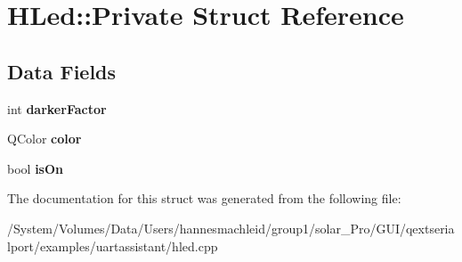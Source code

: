 \hypertarget{struct_h_led_1_1_private}{}\section{H\+Led\+::Private Struct Reference}
\label{struct_h_led_1_1_private}
\subsection*{Data Fields}
\begin{DoxyCompactItemize}
\item 
\mbox{\label{struct_h_led_1_1_private_a6896fb1a8a81269b76f0281649a5b398}} 
int {\bfseries darker\+Factor}
\item 
\mbox{\label{struct_h_led_1_1_private_a824cb7f78107b86b9ddc2dcbd285f66b}} 
Q\+Color {\bfseries color}
\item 
\mbox{\label{struct_h_led_1_1_private_ae530c5af75c42fc2bd1fb588c38aa332}} 
bool {\bfseries is\+On}
\end{DoxyCompactItemize}


The documentation for this struct was generated from the following file\+:\begin{DoxyCompactItemize}
\item 
/\+System/\+Volumes/\+Data/\+Users/hannesmachleid/group1/solar\+\_\+\+Pro/\+G\+U\+I/qextserialport/examples/uartassistant/hled.\+cpp\end{DoxyCompactItemize}
